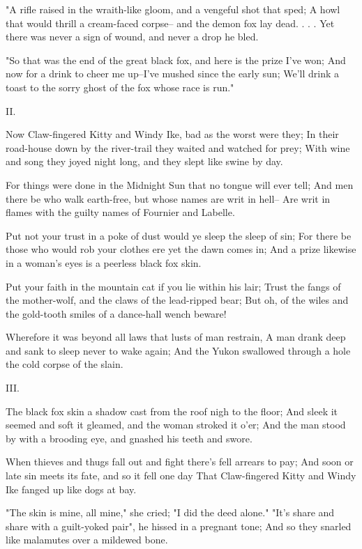 \begin{poemblock}
 "A rifle raised in the wraith-like gloom, and a vengeful shot that sped;
 A howl that would thrill a cream-faced corpse--
   and the demon fox lay dead. . . .
 Yet there was never a sign of wound, and never a drop he bled.

 "So that was the end of the great black fox,
   and here is the prize I've won;
 And now for a drink to cheer me up--I've mushed since the early sun;
 We'll drink a toast to the sorry ghost of the fox whose race is run."


 II.

 Now Claw-fingered Kitty and Windy Ike, bad as the worst were they;
 In their road-house down by the river-trail
   they waited and watched for prey;
 With wine and song they joyed night long, and they slept like swine by day.

 For things were done in the Midnight Sun that no tongue will ever tell;
 And men there be who walk earth-free, but whose names are writ in hell--
 Are writ in flames with the guilty names of Fournier and Labelle.

 Put not your trust in a poke of dust would ye sleep the sleep of sin;
 For there be those who would rob your clothes ere yet the dawn comes in;
 And a prize likewise in a woman's eyes is a peerless black fox skin.

 Put your faith in the mountain cat if you lie within his lair;
 Trust the fangs of the mother-wolf, and the claws of the lead-ripped bear;
 But oh, of the wiles and the gold-tooth smiles
   of a dance-hall wench beware!

 Wherefore it was beyond all laws that lusts of man restrain,
 A man drank deep and sank to sleep never to wake again;
 And the Yukon swallowed through a hole the cold corpse of the slain.


 III.

 The black fox skin a shadow cast from the roof nigh to the floor;
 And sleek it seemed and soft it gleamed, and the woman stroked it o'er;
 And the man stood by with a brooding eye, and gnashed his teeth and swore.

 When thieves and thugs fall out and fight there's fell arrears to pay;
 And soon or late sin meets its fate, and so it fell one day
 That Claw-fingered Kitty and Windy Ike fanged up like dogs at bay.

 "The skin is mine, all mine," she cried; "I did the deed alone."
 "It's share and share with a guilt-yoked pair",
   he hissed in a pregnant tone;
 And so they snarled like malamutes over a mildewed bone.


\end{poemblock}
